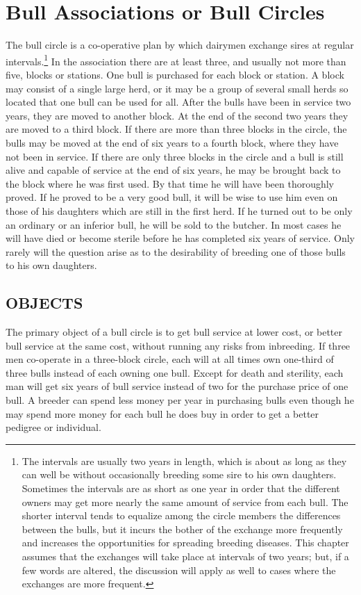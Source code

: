 \chapter{Bull Associations or Bull Circles}
\label{cha:Lush_Chapter_32}

The bull circle is a co-operative plan by which dairymen exchange
sires at regular intervals.\footnote{The intervals are usually two
years in length, which is about as long as they can well be without
occasionally breeding some sire to his own daughters. Sometimes the
intervals are as short as one year in order that the different owners
may get more nearly the same amount of service from each bull. The
shorter interval tends to equalize among the circle members the
differences between the bulls, but it incurs the bother of the
exchange more frequently and increases the opportunities for spreading
breeding diseases. This chapter assumes that the exchanges will take
place at intervals of two years; but, if a few words are altered, the
discussion will apply as well to cases where the exchanges are more
frequent.} In the association there are at least three, and
usually not more than five, blocks or stations. One bull is purchased for
each block or station. A block may consist of a single large herd, or it
may be a group of several small herds so located that one bull can be
used for all. After the bulls have been in service two years, they are
moved to another block. At the end of the second two years they are
moved to a third block. If there are more than three blocks in the circle,
the bulls may be moved at the end of six years to a fourth block, where
they have not been in service. If there are only three blocks in the circle
and a bull is still alive and capable of service at the end of six years, he
may be brought back to the block where he was first used. By that time
he will have been thoroughly proved. If he proved to be a very good
bull, it will be wise to use him even on those of his daughters which are
still in the first herd. If he turned out to be only an ordinary or an
inferior bull, he will be sold to the butcher. In most cases he will have
died or become sterile before he has completed six years of service. Only
rarely will the question arise as to the desirability of breeding one of
those bulls to his own daughters.

\section*{OBJECTS}
The primary object of a bull circle is to get bull service at lower
cost, or better bull service at the same cost, without running any risks
from inbreeding. If three men co-operate in a three-block circle, each
will at all times own one-third of three bulls instead of each owning
one bull. Except for death and sterility, each man will get six years of
bull service instead of two for the purchase price of one bull. A breeder
can spend less money per year in purchasing bulls even though he may
spend more money for each bull he does buy in order to get a better
pedigree or individual.

